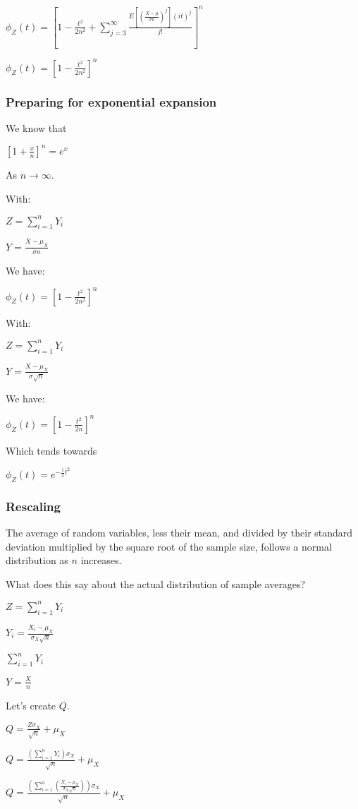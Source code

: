 \(\phi_Z(t)=[1-\frac{t^2}{2n^2} +\sum_{j=3}^{\infty }\frac{E[(\frac{X-\mu}{\sigma n})^j](it)^j}{j!}]^n\)

\(\phi_Z(t)=[1-\frac{t^2}{2n^2}]^n\)

\subsubsection{Preparing for exponential expansion}

We know that

\([1+\frac{x}{n}]^n=e^x\)

As \(n \rightarrow \infty\).

With:

\(Z=\sum_{i=1}^nY_i\)

\(Y=\frac{X-\mu_X }{\sigma n}\)

We have:

\(\phi_Z(t)=[1-\frac{t^2}{2n^2}]^n\)

With:

\(Z=\sum_{i=1}^nY_i\)

\(Y=\frac{X-\mu_X }{\sigma \sqrt n}\)

We have:

\(\phi_Z(t)=[1-\frac{t^2}{2n}]^n\)

Which tends towards

\(\phi_Z(t)=e^{-\frac{1}{2}t^2}\)

\subsubsection{Rescaling}

The average of random variables, less their mean, and divided by their standard deviation multiplied by the square root of the sample size, follows a normal distribution as \(n\) increases.

What does this say about the actual distribution of sample averages?

\(Z=\sum_{i=1}^nY_i\)

\(Y_i=\frac{X_i-\mu_X }{\sigma_X \sqrt n}\)

\(\sum_{i=1}^nY_i\)

\(Y=\frac{X}{n}\)

Let's create \(Q\).

\(Q=\frac{Z\sigma_X }{\sqrt n}+\mu_X\)

\(Q=\frac{(\sum_{i=1}^nY_i)\sigma_X }{\sqrt n}+\mu_X\)

\(Q=\frac{(\sum_{i=1}^n(\frac{X_i-\mu_X }{\sigma_X \sqrt n}))\sigma_X }{\sqrt n}+\mu_X\)

